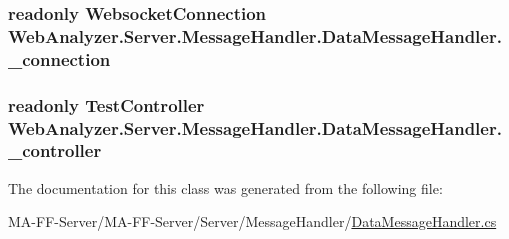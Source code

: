 \subsubsection[{\+\_\+connection}]{\setlength{\rightskip}{0pt plus 5cm}readonly {\bf Websocket\+Connection} Web\+Analyzer.\+Server.\+Message\+Handler.\+Data\+Message\+Handler.\+\_\+connection\hspace{0.3cm}{\ttfamily [private]}}\label{class_web_analyzer_1_1_server_1_1_message_handler_1_1_data_message_handler_a7699c0f75aee40ba03a6be8ea3592df8}
\hypertarget{class_web_analyzer_1_1_server_1_1_message_handler_1_1_data_message_handler_ae67a8ffd73f0ae8ff422db335a7e7924}{}
\subsubsection[{\+\_\+controller}]{\setlength{\rightskip}{0pt plus 5cm}readonly {\bf Test\+Controller} Web\+Analyzer.\+Server.\+Message\+Handler.\+Data\+Message\+Handler.\+\_\+controller\hspace{0.3cm}{\ttfamily [private]}}\label{class_web_analyzer_1_1_server_1_1_message_handler_1_1_data_message_handler_ae67a8ffd73f0ae8ff422db335a7e7924}


The documentation for this class was generated from the following file\+:\begin{DoxyCompactItemize}
\item 
M\+A-\/\+F\+F-\/\+Server/\+M\+A-\/\+F\+F-\/\+Server/\+Server/\+Message\+Handler/\hyperlink{_data_message_handler_8cs}{Data\+Message\+Handler.\+cs}\end{DoxyCompactItemize}

